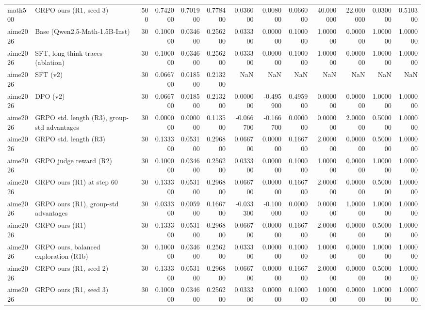 \begin{table}
\begin{tabular}{llrrrrrrrrrrr}
math500 & GRPO ours (R1, seed 3) & 500 & 0.742000 & 0.701900 & 0.778400 & 0.036000 & 0.008000 & 0.066000 & 40.000000 & 22.000000 & 0.030000 & 0.510300 \\
aime2026 & Base (Qwen2.5-Math-1.5B-Inst) & 30 & 0.100000 & 0.034600 & 0.256200 & 0.033300 & 0.000000 & 0.100000 & 1.000000 & 0.000000 & 1.000000 & 1.000000 \\
aime2026 & SFT, long think traces (ablation) & 30 & 0.100000 & 0.034600 & 0.256200 & 0.033300 & 0.000000 & 0.100000 & 1.000000 & 0.000000 & 1.000000 & 1.000000 \\
aime2026 & SFT (v2) & 30 & 0.066700 & 0.018500 & 0.213200 & NaN & NaN & NaN & NaN & NaN & NaN & NaN \\
aime2026 & DPO (v2) & 30 & 0.066700 & 0.018500 & 0.213200 & 0.000000 & -0.495900 & 0.495900 & 0.000000 & 0.000000 & 1.000000 & 1.000000 \\
aime2026 & GRPO std. length (R3), group-std advantages & 30 & 0.000000 & 0.000000 & 0.113500 & -0.066700 & -0.166700 & 0.000000 & 0.000000 & 2.000000 & 0.500000 & 1.000000 \\
aime2026 & GRPO std. length (R3) & 30 & 0.133300 & 0.053100 & 0.296800 & 0.066700 & 0.000000 & 0.166700 & 2.000000 & 0.000000 & 0.500000 & 1.000000 \\
aime2026 & GRPO judge reward (R2) & 30 & 0.100000 & 0.034600 & 0.256200 & 0.033300 & 0.000000 & 0.100000 & 1.000000 & 0.000000 & 1.000000 & 1.000000 \\
aime2026 & GRPO ours (R1) at step 60 & 30 & 0.133300 & 0.053100 & 0.296800 & 0.066700 & 0.000000 & 0.166700 & 2.000000 & 0.000000 & 0.500000 & 1.000000 \\
aime2026 & GRPO ours (R1), group-std advantages & 30 & 0.033300 & 0.005900 & 0.166700 & -0.033300 & -0.100000 & 0.000000 & 0.000000 & 1.000000 & 1.000000 & 1.000000 \\
aime2026 & GRPO ours (R1) & 30 & 0.133300 & 0.053100 & 0.296800 & 0.066700 & 0.000000 & 0.166700 & 2.000000 & 0.000000 & 0.500000 & 1.000000 \\
aime2026 & GRPO ours, balanced exploration (R1b) & 30 & 0.100000 & 0.034600 & 0.256200 & 0.033300 & 0.000000 & 0.100000 & 1.000000 & 0.000000 & 1.000000 & 1.000000 \\
aime2026 & GRPO ours (R1, seed 2) & 30 & 0.133300 & 0.053100 & 0.296800 & 0.066700 & 0.000000 & 0.166700 & 2.000000 & 0.000000 & 0.500000 & 1.000000 \\
aime2026 & GRPO ours (R1, seed 3) & 30 & 0.100000 & 0.034600 & 0.256200 & 0.033300 & 0.000000 & 0.100000 & 1.000000 & 0.000000 & 1.000000 & 1.000000 \\
\bottomrule
\end{tabular}
\end{table}
